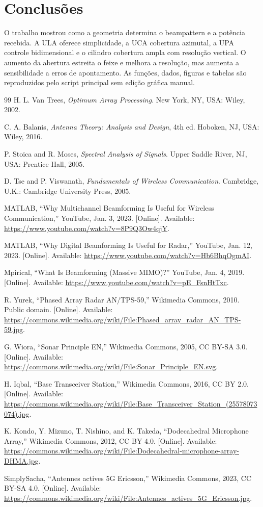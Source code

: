 \documentclass[conference]{IEEEtran}
\begin{document}
\section{Conclusões}
O trabalho mostrou como a geometria determina o beampattern e a potência
recebida. A ULA oferece simplicidade, a UCA cobertura azimutal, a UPA controle
bidimensional e o cilindro cobertura ampla com resolução vertical. O aumento da
abertura estreita o feixe e melhora a resolução, mas aumenta a sensibilidade a
erros de apontamento. As funções, dados, figuras e tabelas são reproduzidos pelo
script principal sem edição gráfica manual.

\begin{thebibliography}{99}
H. L. Van Trees, \emph{Optimum Array Processing}. New York, NY, USA: Wiley,
2002.

C. A. Balanis, \emph{Antenna Theory: Analysis and Design}, 4th ed. Hoboken,
NJ, USA: Wiley, 2016.

P. Stoica and R. Moses, \emph{Spectral Analysis of Signals}. Upper Saddle
River, NJ, USA: Prentice Hall, 2005.

D. Tse and P. Viswanath, \emph{Fundamentals of Wireless Communication}.
Cambridge, U.K.: Cambridge University Press, 2005.

MATLAB, ``Why Multichannel Beamforming Is Useful for Wireless Communication,''
YouTube, Jan. 3, 2023. [Online]. Available:
\url{https://www.youtube.com/watch?v=8P9Q3Ow4qjY}.

MATLAB, ``Why Digital Beamforming Is Useful for Radar,'' YouTube, Jan. 12,
2023. [Online]. Available:
\url{https://www.youtube.com/watch?v=Hb6BhqOgmAI}.

Mpirical, ``What Is Beamforming (Massive MIMO)?'' YouTube, Jan. 4, 2019.
[Online]. Available: \url{https://www.youtube.com/watch?v=pE_FsnHtTxc}.

R. Yurek, ``Phased Array Radar AN/TPS-59,'' Wikimedia Commons, 2010. Public
domain. [Online]. Available:
\url{https://commons.wikimedia.org/wiki/File:Phased_array_radar_AN_TPS-59.jpg}.

G. Wiora, ``Sonar Principle EN,'' Wikimedia Commons, 2005, CC BY-SA 3.0.
[Online]. Available:
\url{https://commons.wikimedia.org/wiki/File:Sonar_Principle_EN.svg}.

H. Iqbal, ``Base Transceiver Station,'' Wikimedia Commons, 2016, CC BY 2.0.
[Online]. Available:
\url{https://commons.wikimedia.org/wiki/File:Base_Transceiver_Station_(25578073074).jpg}.

K. Kondo, Y. Mizuno, T. Nishino, and K. Takeda, ``Dodecahedral Microphone
Array,'' Wikimedia Commons, 2012, CC BY 4.0. [Online]. Available:
\url{https://commons.wikimedia.org/wiki/File:Dodecahedral-microphone-array-DHMA.jpg}.

SimplySacha, ``Antennes actives 5G Ericsson,'' Wikimedia Commons, 2023,
CC BY-SA 4.0. [Online]. Available:
\url{https://commons.wikimedia.org/wiki/File:Antennes_actives_5G_Ericsson.jpg}.
\end{thebibliography}
\end{document}
